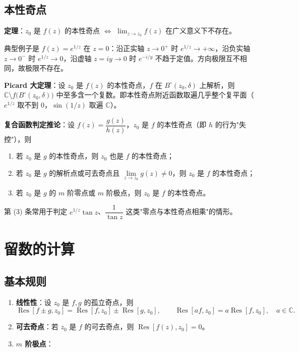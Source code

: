 \subsection{本性奇点}

\textbf{定理}：\(z_0\) 是 \(f(z)\) 的本性奇点 \(\iff\) \(\lim_{z\to z_0}f(z)\) 在广义意义下不存在。

典型例子是 \(f(z)=e^{1/z}\) 在 \(z=0\)：沿正实轴 \(z\to0^+\) 时 \(e^{1/z}\to+\infty\)，沿负实轴 \(z\to0^-\) 时 \(e^{1/z}\to0\)，沿虚轴 \(z=iy\to0\) 时 \(e^{-i/y}\) 不趋于定值。方向极限互不相同，故极限不存在。

\textbf{Picard 大定理}：设 \(z_0\) 是 \(f(z)\) 的本性奇点，\(f\) 在 \(B^\circ(z_0,\delta)\) 上解析，则 \(\mathbb{C}\setminus f\big(B^\circ(z_0,\delta)\big)\) 中至多含一个复数。即本性奇点附近函数取遍几乎整个复平面（\(e^{1/z}\) 取不到 \(0\)，\(\sin(1/z)\) 取遍 \(\mathbb{C}\)）。

\textbf{复合函数判定推论}：设 \(f(z)=\dfrac{g(z)}{h(z)}\)，\(z_0\) 是 \(f\) 的本性奇点（即 \(h\) 的行为"失控"），则
\begin{enumerate}[label=(\arabic*)]
    \item 若 \(z_0\) 是 \(g\) 的本性奇点，则 \(z_0\) 也是 \(f\) 的本性奇点；
    \item 若 \(z_0\) 是 \(g\) 的解析点或可去奇点且 \(\lim\limits_{z\to z_0}g(z)\neq 0\)，则 \(z_0\) 是 \(f\) 的本性奇点；
    \item 若 \(z_0\) 是 \(g\) 的 \(m\) 阶零点或 \(m\) 阶极点，则 \(z_0\) 是 \(f\) 的本性奇点。
\end{enumerate}
第 (3) 条常用于判定 \(e^{1/z}\tan z\)、\(\dfrac{1}{\tan z}\) 这类"零点与本性奇点相乘"的情形。
\section{留数的计算}

\subsection{基本规则}

\begin{enumerate}[label=(\arabic*)]
    \item \textbf{线性性}：设 \(z_0\) 是 \(f,g\) 的孤立奇点，则
    \[
    \operatorname{Res}[f\pm g,z_0]=\operatorname{Res}[f,z_0]\pm\operatorname{Res}[g,z_0],\qquad
    \operatorname{Res}[af,z_0]=a\operatorname{Res}[f,z_0],\quad a\in\mathbb{C}.
    \]
    \item \textbf{可去奇点}：若 \(z_0\) 是 \(f\) 的可去奇点，则 \(\operatorname{Res}[f(z),z_0]=0\)。
    \item \textbf{\(m\) 阶极点}：
\end{enumerate}

